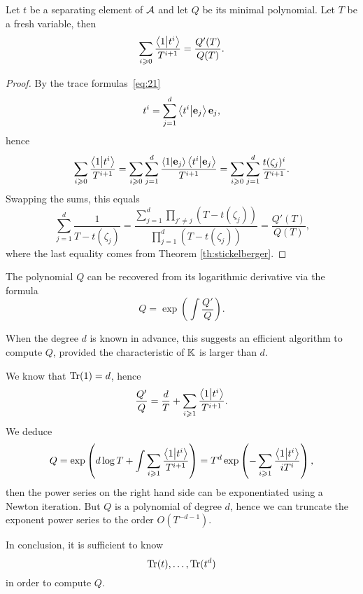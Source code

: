 \begin{lemma}
  \label{th:multi-newton-sums}
  Let $t$ be a separating element of $\mathcal{A}$ and let $Q$ be its
  minimal polynomial. Let $T$ be a fresh variable, then
  \begin{equation}
    \label{eq:25}
    \sum_{i\geqslant0} \frac{\left\langle 1 \middle| t^{i} \right\rangle}{T^{i+1}} = \frac{Q'(T)}{Q(T)}
    \text{.}
  \end{equation}
\end{lemma}
\begin{proof}
  By the trace formulas~\eqref{eq:21}
  \begin{equation}
    \label{eq:26}
    t^i = \sum_{j=1}^d\left\langle t^i \middle| \mathbf{e}_j \right\rangle\mathbf{e}_j
    \text{,}
  \end{equation}
  hence
  \begin{equation}
    \label{eq:27}
    \sum_{i\geqslant0}\frac{\left\langle 1 \middle| t^i \right\rangle}{T^{i+1}} =
    \sum_{i\geqslant0}\sum_{j=1}^d\frac{\left\langle 1 \middle| \mathbf{e}_j \right\rangle\left\langle t^i \middle| \mathbf{e}_j \right\rangle}{T^{i+1}} =
    \sum_{i\geqslant0}\sum_{j=1}^d\frac{t(\zeta_j)^i}{T^{i+1}}
    \text{.}
  \end{equation}
  Swapping the sums, this equals
  \begin{equation}
    \label{eq:28}
    \sum_{j=1}^d\frac{1}{T-t(\zeta_j)} =
    \frac{\sum_{j=1}^d\prod_{j'\ne j}(T-t(\zeta_j))}{\prod_{j=1}^d(T-t(\zeta_j))} =
    \frac{Q'(T)}{Q(T)}
    \text{,}
  \end{equation}
  where the last equality comes from Theorem \ref{th:stickelberger}.
\end{proof}

\begin{remark}
  The polynomial $Q$ can be recovered from its logarithmic derivative
  via the formula
  \begin{equation}
    \label{eq:30}
    Q = \exp\left(\int \frac{Q'}{Q}\right)
    \text{.}
  \end{equation}
  

  When the degree $d$ is known in advance, this suggests an efficient
  algorithm to compute $Q$, provided the characteristic of $\mathbb{K}$ is
  larger than $d$. 

  We know that $\operatorname{Tr}(1)=d$, hence 
  \begin{equation}
    \label{eq:32}
    \frac{Q'}{Q} =
    \frac{d}{T} + \sum_{i\geqslant 1}\frac{\left\langle 1 \middle| t^i \right\rangle}{T^{i+1}} 
    \text{.}
  \end{equation}
  We deduce
  \begin{equation}
    \label{eq:33}
    Q = \exp\left(d\log T + \int\sum_{i\geqslant1}\frac{\left\langle 1 \middle| t^i \right\rangle}{T^{i+1}}\right) =
    T^d\exp\left(-\sum_{i\geqslant 1}\frac{\left\langle 1 \middle| t^i \right\rangle}{iT^i}\right)
    \text{,}
  \end{equation}
  then the power series on the right hand side can be exponentiated
  using a Newton iteration.  But $Q$ is a polynomial of degree $d$,
  hence we can truncate the exponent power series to the order
  $O(T^{-d-1})$.

  In conclusion, it is sufficient to know
  \begin{equation}
    \label{eq:34}
    \operatorname{Tr}(t),\ldots,\operatorname{Tr}(t^d)
  \end{equation}
  in order to compute $Q$.
\end{remark}

